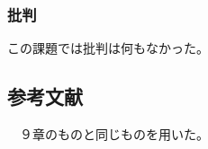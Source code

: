 \documentclass{scrartcl}
\begin{document}
\subsubsection{批判}
\label{sec:org8030815}
この課題では批判は何もなかった。\\

\subsection{参考文献}
\label{sec:org18d6af8}
　９章のものと同じものを用いた。\\
\end{document}
